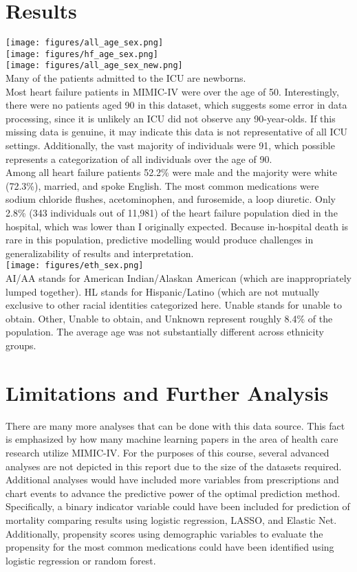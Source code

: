 \documentclass{article}
\begin{document}
\section{Results}
\texttt{[image: figures/all\_age\_sex.png]}\\
\texttt{[image: figures/hf\_age\_sex.png]}\\
\texttt{[image: figures/all\_age\_sex\_new.png]}\\
Many of the patients admitted to the ICU are newborns.\\
Most heart failure patients in MIMIC-IV were over the age of 50. Interestingly, there were no patients aged 90 in this dataset, which suggests some error in data processing, since it is unlikely an ICU did not observe any 90-year-olds. If this missing data is genuine, it may indicate this data is not representative of all ICU settings. Additionally, the vast majority of individuals were 91, which possible represents a categorization of all individuals over the age of 90.\\
Among all heart failure patients 52.2\% were male and the majority were white (72.3\%), married, and spoke English. The most common medications were sodium chloride flushes, acetominophen, and furosemide, a loop diuretic. Only 2.8\% (343 individuals out of 11,981) of the heart failure population died in the hospital, which was lower than I originally expected. Because in-hospital death is rare in this population, predictive modelling would produce challenges in generalizability of results and interpretation.\\
\texttt{[image: figures/eth\_sex.png]}\\
AI/AA stands for American Indian/Alaskan American (which are inappropriately lumped together). HL stands for Hispanic/Latino (which are not mutually exclusive to other racial identities categorized here. Unable stands for unable to obtain. Other, Unable to obtain, and Unknown represent roughly 8.4\% of the population. The average age was not substantially different across ethnicity groups.
\section{Limitations and Further Analysis}
There are many more analyses that can be done with this data source. This fact is emphasized by how many machine learning papers in the area of health care research utilize MIMIC-IV. For the purposes of this course, several advanced analyses are not depicted in this report due to the size of the datasets required. Additional analyses would have included more variables from prescriptions and chart events to advance the predictive power of the optimal prediction method. Specifically, a binary indicator variable could have been included for prediction of mortality comparing results using logistic regression, LASSO, and Elastic Net. Additionally, propensity scores using demographic variables to evaluate the propensity for the most common medications could have been identified using logistic regression or random forest. 
\end{document}
